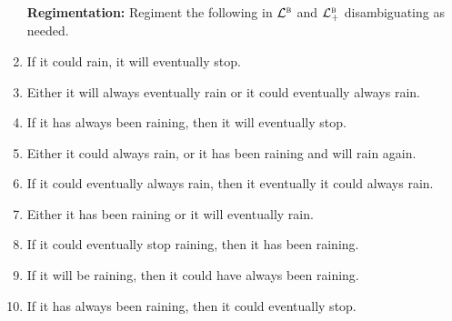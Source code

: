 \documentclass[a4paper, 11pt]{article}                  %
\begin{document}
\begin{enumerate}

	\item[\bf Regimentation:] Regiment the following in $\mathcal{L}^{\textsc{b}}$ and $\mathcal{L}^{\textsc{b}}_+$ disambiguating as needed.

    \item If it could rain, it will eventually stop.

    \item Either it will always eventually rain or it could eventually always rain.

    \item If it has always been raining, then it will eventually stop.

    \item Either it could always rain, or it has been raining and will rain again.

    \item If it could eventually always rain, then it eventually it could always rain.

    \item Either it has been raining or it will eventually rain.

    \item If it could eventually stop raining, then it has been raining.

    \item If it will be raining, then it could have always been raining.

    \item If it has always been raining, then it could eventually stop.


\end{enumerate}
\end{document}
